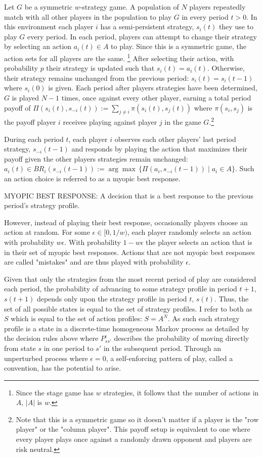 Let $G$ be a symmetric $w$-strategy game. A population of $N$ players repeatedly match with all other players in the population to play $G$ in every period $t>0$. In this environment each player $i$ has a semi-persistent strategy, $s_i(t)$ they use to play $G$ every period. In each period, players can attempt to change their strategy by selecting an action $a_i(t) \in A$ to play. Since this is a symmetric game, the action sets for all players are the same. \footnote{Since the stage game has $w$ strategies, it follows that the number of actions in $A$, $|A|$ is $w$.} After selecting their action, with probability $p$ their strategy is updated such that $s_i(t) = a_i(t)$. Otherwise, their strategy remains unchanged from the previous period: $s_i(t) = s_i(t-1)$ where $s_i(0)$ is given. Each period after players strategies have been determined, $G$ is played $N-1$ times, once against every other player, earning a total period payoff of $\Pi(s_i(t), s_{-i}(t)) := \sum\limits_{j \neq i} \pi(s_i(t), s_j(t))$ where $\pi(s_i, s_j)$ is the payoff player $i$ receives playing against player $j$ in the game $G$.\footnote{Note that this is a symmetric game so it doesn't matter if a player is the "row player" or the "column player". This payoff setup is equivalent to one where every player plays once against a randomly drawn opponent and players are risk neutral.}

During each period $t$, each player $i$ observes each other players' last period strategy, $s_{-i}(t-1)$ and responds by playing the action that maximizes their payoff given the other players strategies remain unchanged: $a_i(t) \in BR_i(s_{-i}(t-1)) := \arg \max \, \{ \Pi(a_i, s_{-i}(t-1)) \mid a_i \in A \}.$ Such an action choice is referred to as a myopic best response.

\begin{definition}
   MYOPIC BEST RESPONSE: A decision that is a best response to the previous period's strategy profile. 
\end{definition}

However, instead of playing their best response, occasionally players choose an action at random. For some $\epsilon \in [0,1/w)$, each player randomly selects an action with probability $w\epsilon$. With probability $1-w\epsilon$ the player selects an action that is in their set of myopic best responses. Actions that are not myopic best responses are called "mistakes" and are thus played with probability $\epsilon$.  

Given that only the strategies from the most recent period of play are considered each period, the probability of advancing to some strategy profile in period $t+1$, $s(t+1)$ depends only upon the strategy profile in period $t$, $s(t)$. Thus, the set of all possible states is equal to the set of strategy profiles. I refer to both as $S$ which is equal to the set of action profiles: $S = A^N$. As such each strategy profile is a state in a discrete-time homogeneous Markov process as detailed by the decision rules above where $P^{\epsilon}_{ss'}$ describes the probability of moving directly from state $s$ in one period to $s'$ in the subsequent period.
Through an unperturbed process where $\epsilon = 0$,
a self-enforcing pattern of play, called a convention, has the potential to arise. 

